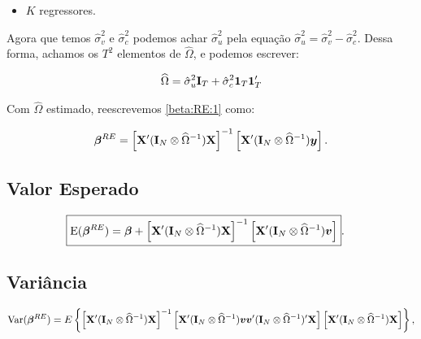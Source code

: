\documentclass[11pt, oneside, a4paper, article]{article}
\numberwithin{equation}{section}
\begin{document}
\begin{description}
\begin{itemize}
		\item $K$ regressores.
	\end{itemize}

	Agora que temos $\hat{\sigma}^2_{v}$ e $\hat{\sigma}^2_{c}$ podemos achar $\hat{\sigma}^{2}_{u}$ pela equação $\boxed{\hat{\sigma}_{u}^{2} = \hat{\sigma}_{v}^{2} - \hat{\sigma}_{c}^{2}}$.
	Dessa forma, achamos os $T^2$ elementos de $\widehat{\Omega}$, e podemos escrever:

	\vspace{-1 em}
	\begin{align*}
		\widehat{\Omega}
		= 
		\hat{\sigma}^{2}_{u} \mathbf{I}_{T} + \hat{\sigma}_{c}^{2} \boldsymbol{1}_{T} \boldsymbol{1}_{T}'
	\end{align*}

	Com $\widehat{\Omega}$ estimado, reescrevemos \eqref{beta:RE:1} como:

	\vspace{-1 em}
	\begin{align} \label{beta:RE:2}
		\boldsymbol{\beta}^{RE} = 
		\left[ \mathbf{X}' (\mathbf{I}_{N} \otimes \widehat{\Omega}^{-1}) \mathbf{X} \right]^{-1}
		\left[ \mathbf{X}' (\mathbf{I}_{N} \otimes \widehat{\Omega}^{-1}) \boldsymbol{y} \right].
	\end{align}


	\subsection{Valor Esperado}

	\vspace{-1 em}
	\begin{align*}
		\Aboxed{
			\E( \betavec^{RE} ) = 
			\betavec +
			\left[ \Xmat' (\Imat_{N} \otimes \widehat{\Omega}^{-1}) \Xmat \right]^{-1}
		\left[ \Xmat' (\Imat_{N} \otimes \widehat{\Omega}^{-1}) \mbs{v} \right] }.
	\end{align*}

	\subsection{Variância}

	\vspace{-1 em}
	\begin{align*} 
		\text{Var}( \boldsymbol{\beta}^{RE} ) = 
		E
		\left\{ 
			\left[ \mathbf{X}' ( \mathbf{I}_{N} \otimes \widehat{\Omega}^{-1} ) \mathbf{X} \right]^{-1}
			\left[
				\mathbf{X}' ( \mathbf{I}_{N} \otimes \widehat{\Omega}^{-1} )
				\boldsymbol{v} \boldsymbol{v}'
				( \mathbf{I}_{N} \otimes \widehat{\Omega}^{-1} )' \mathbf{X}
			\right]
			\left[ \mathbf{X}' ( \mathbf{I}_{N} \otimes \widehat{\Omega}^{-1} ) \mathbf{X} \right]
		\right\},
	\end{align*}


\end{description}
\end{document}
